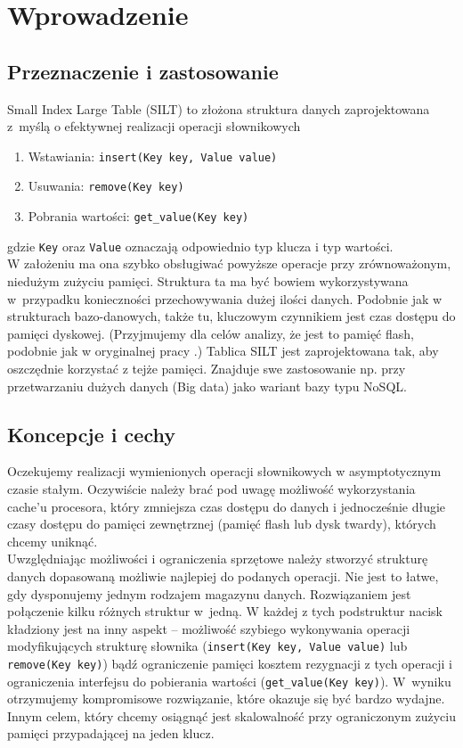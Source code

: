 \documentclass[declaration,shortabstract,masc]{iithesis}
\author{Paweł Guzewicz}
\begin{document}
	\chapter{Wprowadzenie}
		\section{Przeznaczenie i zastosowanie}
			Small Index Large Table (SILT) to złożona struktura danych zaprojektowana z~myślą o efektywnej realizacji operacji słownikowych
			\begin{enumerate}
				\item
					Wstawiania: \texttt{insert(Key key, Value value)}
				\item
					Usuwania: \texttt{remove(Key key)}
				\item
					Pobrania wartości: \texttt{get\_value(Key key)}
			\end{enumerate}
			gdzie \texttt{Key} oraz \texttt{Value} oznaczają odpowiednio typ klucza i typ wartości.\\
			\indent W założeniu ma ona szybko obsługiwać powyższe operacje przy zrównoważonym, niedużym zużyciu pamięci. Struktura ta ma być bowiem wykorzystywana w~przypadku konieczności przechowywania dużej ilości danych. Podobnie jak w strukturach bazo-danowych, także tu, kluczowym czynnikiem jest czas dostępu do pamięci dyskowej. (Przyjmujemy dla celów analizy, że jest to pamięć flash, podobnie jak w oryginalnej pracy \cite{SILT}.) Tablica SILT jest zaprojektowana tak, aby oszczędnie korzystać z tejże pamięci. Znajduje swe zastosowanie np. przy przetwarzaniu dużych danych (Big data) jako wariant bazy typu NoSQL.
		\section{Koncepcje i cechy}
			Oczekujemy realizacji wymienionych operacji słownikowych w asymptotycznym czasie stałym. Oczywiście należy brać pod uwagę możliwość wykorzystania cache'u procesora, który zmniejsza czas dostępu do danych i jednocześnie długie czasy dostępu do pamięci zewnętrznej (pamięć flash lub dysk twardy), których chcemy uniknąć.\\
			\indent Uwzględniając możliwości i ograniczenia sprzętowe należy stworzyć strukturę danych dopasowaną możliwie najlepiej do podanych operacji. Nie jest to łatwe, gdy dysponujemy jednym rodzajem magazynu danych. Rozwiązaniem jest połączenie kilku różnych struktur w~jedną. W każdej z tych podstruktur nacisk kładziony jest na inny aspekt -- możliwość szybiego wykonywania operacji modyfikujących strukturę słownika (\texttt{insert(Key key, Value value)} lub \texttt{remove(Key key)}) bądź ograniczenie pamięci kosztem rezygnacji z tych operacji i ograniczenia interfejsu do pobierania wartości (\texttt{get\_value(Key key)}). W~wyniku otrzymujemy kompromisowe rozwiązanie, które okazuje się być bardzo wydajne.\\
			\indent Innym celem, który chcemy osiągnąć jest skalowalność przy ograniczonym zużyciu pamięci przypadającej na jeden klucz.
\end{document}
